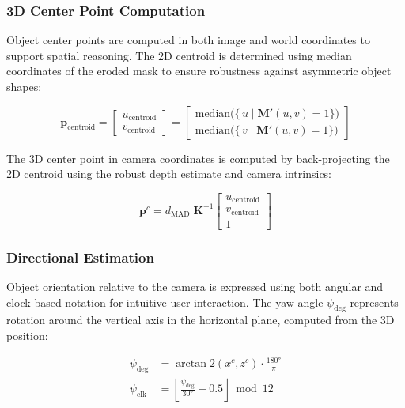 \subsubsection{3D Center Point Computation}

Object center points are computed in both image and world coordinates to support spatial reasoning. The 2D centroid is determined using median coordinates of the eroded mask to ensure robustness against asymmetric object shapes:

\begin{equation}
\mathbf{p}_{\mathrm{centroid}}
=
\begin{bmatrix}
u_{\mathrm{centroid}}\\[6pt]
v_{\mathrm{centroid}}
\end{bmatrix}
=
\begin{bmatrix}
\displaystyle
\mathrm{median}\bigl(\{\,u \mid \mathbf{M}'(u,v)=1\}\bigr)
\\[10pt]
\displaystyle
\mathrm{median}\bigl(\{\,v \mid \mathbf{M}'(u,v)=1\}\bigr)
\end{bmatrix}
\label{eq:centroid}
\end{equation}

The 3D center point in camera coordinates is computed by back-projecting the 2D centroid using the robust depth estimate and camera intrinsics:

\begin{equation}
\mathbf{p}^c
=
d_{\mathrm{MAD}}\;\mathbf{K}^{-1}
\begin{bmatrix}
u_{\mathrm{centroid}}\\[4pt]
v_{\mathrm{centroid}}\\[4pt]
1
\end{bmatrix}
\end{equation}

\subsubsection{Directional Estimation}
Object orientation relative to the camera is expressed using both angular and clock-based notation for intuitive user interaction. The yaw angle \(\psi_{\text{deg}}\) represents rotation around the vertical axis in the horizontal plane, computed from the 3D position:

\begin{equation}
\begin{aligned}
\psi_{\text{deg}} &= \arctan2\left(x^c, z^c\right) \cdot \frac{180°}{\pi} \\
\psi_{\text{clk}} &= \left\lfloor \frac{\psi_{\text{deg}}}{30°} + 0.5 \right\rfloor \bmod 12
\end{aligned}
\end{equation}

